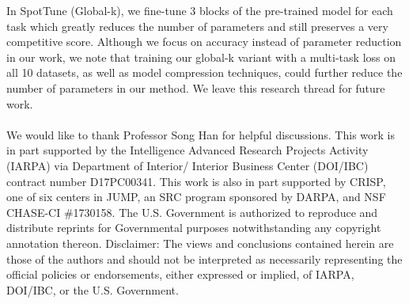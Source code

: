 \documentclass[10pt,twocolumn,letterpaper]{article}
\begin{document}
 In SpotTune (Global-k), we fine-tune 3 blocks of the pre-trained model for each task which greatly reduces the number of parameters and still preserves a very competitive score.  Although we focus on accuracy instead of parameter reduction in our work, we note that training our global-k variant with a multi-task loss on all 10 datasets, as well as model compression techniques, could further reduce the number of parameters in our method. We leave this research thread for future work.
\\
\\
We would like to thank Professor Song Han for helpful discussions. This work is in part supported by the Intelligence Advanced Research Projects Activity (IARPA) via Department of Interior/ Interior Business Center (DOI/IBC) contract number D17PC00341. This work is also in part supported  by CRISP, one of six centers in JUMP, an SRC program sponsored by DARPA, and NSF CHASE-CI \#1730158. The U.S. Government is authorized to reproduce and distribute reprints for Governmental purposes notwithstanding any copyright annotation thereon. Disclaimer: The views and conclusions contained herein are those of the authors and should not be interpreted as necessarily representing the official policies or endorsements, either expressed or implied, of IARPA, DOI/IBC, or the U.S. Government.
\end{document}
